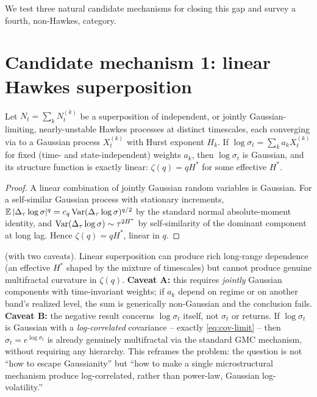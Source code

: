 \documentclass[11pt]{article}
\begin{document}
We test three natural candidate mechanisms for closing this gap and survey a fourth, non-Hawkes, category.

\section{Candidate mechanism 1: linear Hawkes superposition}

\begin{proposition}
Let $N_t = \sum_k N_t^{(k)}$ be a superposition of independent, or jointly Gaussian-limiting, nearly-unstable Hawkes processes at distinct timescales, each converging via \citet{jaisson2016rough} to a Gaussian process $X_t^{(k)}$ with Hurst exponent $H_k$. If $\log\sigma_t = \sum_k a_k X_t^{(k)}$ for fixed (time- and state-independent) weights $a_k$, then $\log\sigma_t$ is Gaussian, and its structure function is exactly linear: $\zeta(q)=qH^*$ for some effective $H^*$.
\end{proposition}
\begin{proof}
A linear combination of jointly Gaussian random variables is Gaussian. For a self-similar Gaussian process with stationary increments, $\operatorname{\mathbb{E}}|\Delta_\tau \log\sigma|^q = c_q \operatorname{Var}(\Delta_\tau\log\sigma)^{q/2}$ by the standard normal absolute-moment identity, and $\operatorname{Var}(\Delta_\tau\log\sigma)\sim\tau^{2H^*}$ by self-similarity of the dominant component at long lag. Hence $\zeta(q)=qH^*$, linear in $q$.
\end{proof}

\begin{finding}
 (with two caveats). Linear superposition can produce rich long-range dependence (an effective $H^*$ shaped by the mixture of timescales) but cannot produce genuine multifractal curvature in $\zeta(q)$. \textbf{Caveat A:} this requires \emph{jointly} Gaussian components with time-invariant weights; if $a_k$ depend on regime or on another band's realized level, the sum is generically non-Gaussian and the conclusion fails. \textbf{Caveat B:} the negative result concerns $\log\sigma_t$ itself, not $\sigma_t$ or returns. If $\log\sigma_t$ is Gaussian with a \emph{log-correlated} covariance -- exactly \eqref{eq:cov-limit} -- then $\sigma_t=e^{\log\sigma_t}$ is already genuinely multifractal via the standard GMC mechanism, without requiring any hierarchy. This reframes the problem: the question is not ``how to escape Gaussianity'' but ``how to make a single microstructural mechanism produce log-correlated, rather than power-law, Gaussian log-volatility.''
\end{finding}
\end{document}
